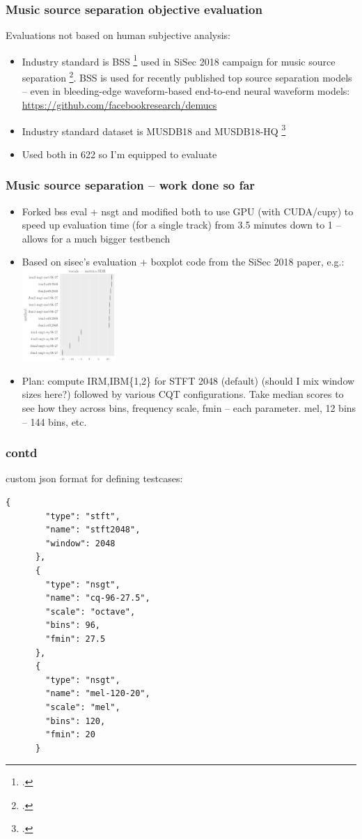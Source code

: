 \documentclass[usenames,dvipsnames]{beamer}
\begin{document}
\begin{frame}
	\frametitle{Music source separation objective evaluation}
	Evaluations not based on human subjective analysis:
	\begin{itemize}
		\item
			Industry standard is BSS \footcite{bss} used in SiSec 2018 campaign for music source separation \footcite{sigsep2018}. BSS is used for recently published top source separation models -- even in bleeding-edge waveform-based end-to-end neural waveform models: \href{https://github.com/facebookresearch/demucs}{https://github.com/facebookresearch/demucs}
		\item
			Industry standard dataset is MUSDB18 and MUSDB18-HQ \footcite{musdb18, musdb18-hq}
		\item
			Used both in 622 so I'm equipped to evaluate
	\end{itemize}
\end{frame}

\begin{frame}
	\frametitle{Music source separation -- work done so far}
	\begin{itemize}
		\item
			Forked bss eval + nsgt and modified both to use GPU (with CUDA/cupy) to speed up evaluation time (for a single track) from 3.5 minutes down to 1 -- allows for a much bigger testbench
		\item
			Based on sisec's evaluation + boxplot code from the SiSec 2018 paper, e.g.:\\
			\includegraphics[height=3.5cm]{./irm_boxplot_example.png}
		\item
			Plan: compute IRM,IBM\{1,2\} for STFT 2048 (default) (should I mix window sizes here?) followed by various CQT configurations. Take median scores to see how they across bins, frequency scale, fmin -- each parameter. mel, 12 bins -- 144 bins, etc.
	\end{itemize}
\end{frame}

\begin{frame}[fragile]
	\frametitle{contd}
	custom json format for defining testcases:
	\begin{Verbatim}[fontsize=\tiny]
	  {
	    "type": "stft",
	    "name": "stft2048",
	    "window": 2048
	  },
	  {
	    "type": "nsgt",
	    "name": "cq-96-27.5",
	    "scale": "octave",
	    "bins": 96,
	    "fmin": 27.5
	  },
	  {
	    "type": "nsgt",
	    "name": "mel-120-20",
	    "scale": "mel",
	    "bins": 120,
	    "fmin": 20
	  }
	\end{Verbatim}
\end{frame}
\end{document}
